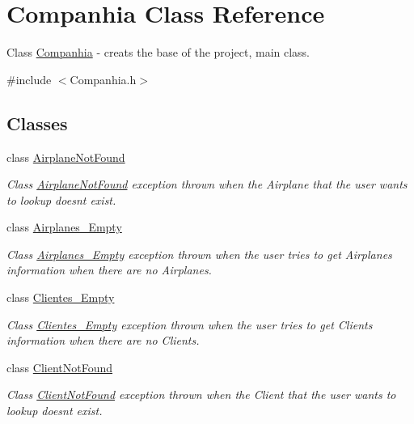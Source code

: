 \hypertarget{class_companhia}{}\section{Companhia Class Reference}
\label{class_companhia}


Class \hyperlink{class_companhia}{Companhia} -\/ creats the base of the project, main class.  




{\ttfamily \#include $<$Companhia.\+h$>$}

\subsection*{Classes}
\begin{DoxyCompactItemize}
\item 
class \hyperlink{class_companhia_1_1_airplane_not_found}{Airplane\+Not\+Found}
\begin{DoxyCompactList}\small\item\em Class \hyperlink{class_companhia_1_1_airplane_not_found}{Airplane\+Not\+Found} exception thrown when the Airplane that the user wants to lookup doesn\textquotesingle{}t exist. \end{DoxyCompactList}\item 
class \hyperlink{class_companhia_1_1_airplanes___empty}{Airplanes\+\_\+\+Empty}
\begin{DoxyCompactList}\small\item\em Class \hyperlink{class_companhia_1_1_airplanes___empty}{Airplanes\+\_\+\+Empty} exception thrown when the user tries to get Airplanes information when there are no Airplanes. \end{DoxyCompactList}\item 
class \hyperlink{class_companhia_1_1_clientes___empty}{Clientes\+\_\+\+Empty}
\begin{DoxyCompactList}\small\item\em Class \hyperlink{class_companhia_1_1_clientes___empty}{Clientes\+\_\+\+Empty} exception thrown when the user tries to get Clients information when there are no Clients. \end{DoxyCompactList}\item 
class \hyperlink{class_companhia_1_1_client_not_found}{Client\+Not\+Found}
\begin{DoxyCompactList}\small\item\em Class \hyperlink{class_companhia_1_1_client_not_found}{Client\+Not\+Found} exception thrown when the Client that the user wants to lookup doesn\textquotesingle{}t exist. \end{DoxyCompactList}\item 

\end{DoxyCompactItemize}
